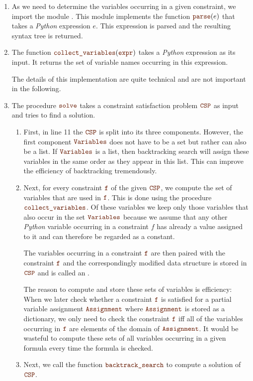 \begin{enumerate}
\item As we need to determine the variables occurring in a given constraint, we import the module
      .  This module implements the function $\mytt{parse}(e)$ that takes
      a \textsl{Python} expression $e$.  This expression is parsed and the resulting syntax tree is returned.
\item The function $\mytt{collect\_variables}(\mytt{expr})$ takes a \textsl{Python} expression as its input.
      It returns the set of variable names occurring in this expression.

      The details of this implementation are quite technical and are not important in the following.
\item The procedure $\mytt{solve}$ takes a constraint satisfaction problem $\mytt{CSP}$ as input and tries
      to find a solution.    
      \begin{enumerate}
      \item First, in line 11 the $\mytt{CSP}$ is split into its three components.  However, the first
            component $\mytt{Variables}$ does not have to be a set but rather can also be a list.
            If $\mytt{Variables}$ is a list, then backtracking search will assign these variables 
            in the same order as they appear in this list.  This can improve the efficiency of backtracking
            tremendously. 
      \item Next, for every constraint $\mytt{f}$ of the given $\mytt{CSP}$, we compute the set of variables that
            are used in $\mytt{f}$.  This is done using the procedure $\mytt{collect\_variables}$.
            Of these variables we keep only those variables that also occur in the set $\mytt{Variables}$
            because we assume that any other \textsl{Python} variable occurring in a constraint $f$ has already
            a value assigned to it and can therefore be regarded as a constant.

            The variables occurring in a constraint $\mytt{f}$ are then paired with the constraint $\mytt{f}$ and
            the correspondingly modified data structure is stored in $\mytt{CSP}$ and is called an
            .

            The reason to compute and store these sets of variables is efficiency: When we later check whether
            a constraint $\mytt{f}$ is satisfied for a partial variable assignment $\mytt{Assignment}$ where $\mytt{Assignment}$ is
            stored as a dictionary, we only need to check the constraint $\mytt{f}$ iff all of the variables occurring
            in $\mytt{f}$ are elements of the domain of $\mytt{Assignment}$.   It would be wasteful to compute
            these sets of all variables occurring in a given formula every time the formula is checked.
      \item Next, we call the function $\mytt{backtrack\_search}$ to compute a solution of $\mytt{CSP}$.
   \end{enumerate}
 \end{enumerate}

